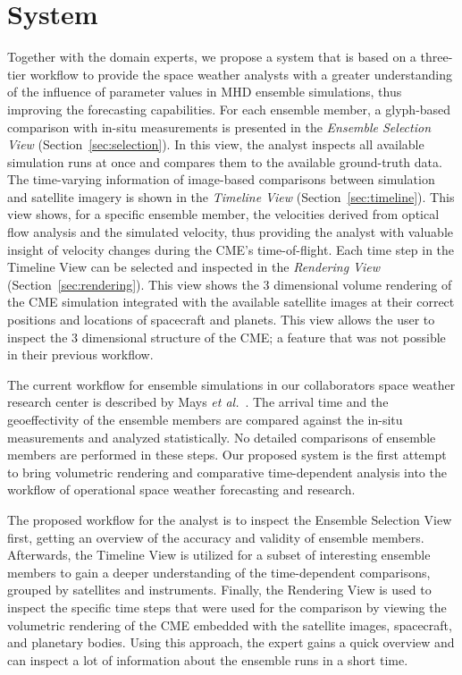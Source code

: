 \documentclass[journal]{vgtc}                %
\def\etal{\textit{et al.}}
\def\etal{\textit{et al.}}
\begin{document}
\section{System}
Together with the domain experts, we propose a system that is based on a three-tier workflow to provide the space weather analysts with a greater understanding of the influence of parameter values in MHD ensemble simulations, thus improving the forecasting capabilities. For each ensemble member, a glyph-based comparison with in-situ measurements is presented in the \emph{Ensemble Selection View} (Section~\ref{sec:selection}). In this view, the analyst inspects all available simulation runs at once and compares them to the available ground-truth data. The time-varying information of image-based comparisons between simulation and satellite imagery is shown in the \emph{Timeline View} (Section~\ref{sec:timeline}). This view shows, for a specific ensemble member, the velocities derived from optical flow analysis and the simulated velocity, thus providing the analyst with valuable insight of velocity changes during the CME's time-of-flight. Each time step in the Timeline View can be selected and inspected in the \emph{Rendering View} (Section~\ref{sec:rendering}). This view shows the 3 dimensional volume rendering of the CME simulation integrated with the available satellite images at their correct positions and locations of spacecraft and planets. This view allows the user to inspect the 3 dimensional structure of the CME; a feature that was not possible in their previous workflow.

The current workflow for ensemble simulations in our collaborators space weather research center is described by Mays \etal ~\cite{mays2015ensemble}. The arrival time and the geoeffectivity of the ensemble members are compared against the in-situ measurements and analyzed statistically. No detailed comparisons of ensemble members are performed in these steps. Our proposed system is the first attempt to bring volumetric rendering and comparative time-dependent analysis into the workflow of operational space weather forecasting and research.

The proposed workflow for the analyst is to inspect the Ensemble Selection View first, getting an overview of the accuracy and validity of ensemble members. Afterwards, the Timeline View is utilized for a subset of interesting ensemble members to gain a deeper understanding of the time-dependent comparisons, grouped by satellites and instruments. Finally, the Rendering View is used to inspect the specific time steps that were used for the comparison by viewing the volumetric rendering of the CME embedded with the satellite images, spacecraft, and planetary bodies. Using this approach, the expert gains a quick overview and can inspect a lot of information about the ensemble runs in a short time.
\end{document}
